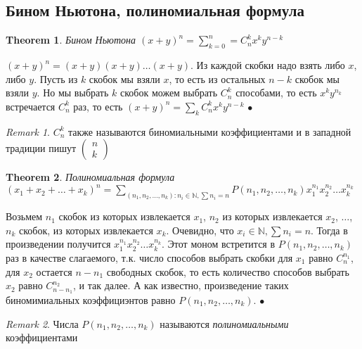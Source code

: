 \documentclass[a4paper]{article}
\theoremstyle{plain}
\newtheorem{theorem}{Theorem}
\theoremstyle{remark}
\newtheorem*{remark}{Remark}
\theoremstyle{definition}
\renewenvironment{proof}{{\bfseries Proof}}{$\bullet$}
\newcommand{\combus}[2]{\left(\begin{smallmatrix}#1 \\ #2 \end{smallmatrix} \right)} %
\newcommand{\combru}[2]{C_{#1}^{#2}} %
\newcommand{\myN}{\mathbb{N}}
\newcommand{\mysum}{\sum\limits}
\begin{document}
\subsection{Бином Ньютона, полиномиальная формула}
\begin{theorem}{Бином Ньютона}
	$(x+y)^n = \mysum_{k=0}^n = C_n^k x^k y^{n-k}$ 
\end{theorem}

\begin{proof}
	$(x+y)^n = (x+y)(x+y) \ldots (x+y)$. Из каждой скобки надо взять либо $x$, либо $y$. Пусть из $k$ скобок мы взяли $x$, то есть из остальных $n-k$ скобок мы взяли $y$. Но мы выбрать $k$ скобок можем выбрать $C_n^k$ способами, то есть $x^k y^{n_k}$ встречается $C_n^k$ раз, то есть $(x+y)^n = \mysum_k C_n^k x^k y^{n-k}$
\end{proof}

\begin{remark}
	$C_n^k$ также называются биномиальными коэффициентами и в западной традиции пишут $\combus{n}{k}$
\end{remark}

\begin{theorem}{Полиномиальная формула}
	\newline
	$(x_1 + x_2 + \ldots + x_k)^n = \mysum_{(n_1, n_2, \ldots, n_k): n_i \in \myN, \mysum n_i = n}P(n_1,n_2, \ldots, n_k)x_1^{n_1}x_2^{n_2}\ldots x_k^{n_k}$
\end{theorem}

\begin{proof}
	Возьмем $n_1$ скобок из которых извлекается $x_1$, $n_2$ из которых извлекается $x_2$, $\ldots$, $n_k$ скобок, из которых извлекается $x_k$. Очевидно, что $x_i \in \myN, \mysum n_i = n$. Тогда в произведении получится $x_1^{n_1} x_2^{n_2} \ldots x_k^{n_k}$. Этот моном встретится в $P(n_1, n_2, \ldots, n_k)$ раз в качестве слагаемого, т.к. число способов выбрать скобки для $x_1$ равно $\combru{n}{n_1}$, для $x_2$ остается $n-n_1$ свободных скобок, то есть количество способов выбрать $x_2$ равно $\combru{n-n_1}{n_2}$, и так далее. А как известно, произведение таких биномимиальных коэффициэнтов равно $P(n_1, n_2, \ldots, n_k)$.
\end{proof}

\begin{remark} 
	Числа $P(n_1, n_2, \ldots, n_k)$ называются \emph{полиномиальными} коэффициентами
\end{remark}
\end{document}
